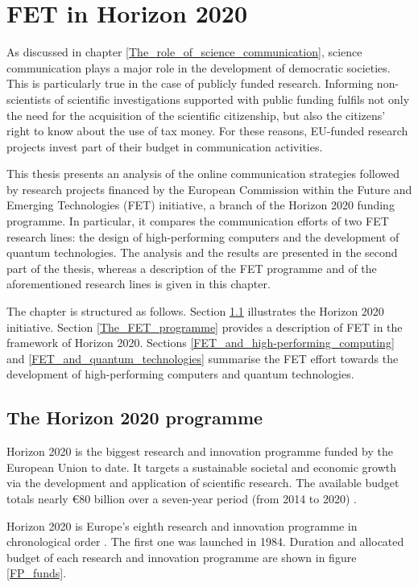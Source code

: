 \chapter{FET in Horizon 2020} \label{FET_in_Horizon_2020}
As discussed in chapter \ref{The_role_of_science_communication}, science communication plays a major role in the development of democratic societies. This is particularly true in the case of publicly funded research. Informing non-scientists of scientific investigations supported with public funding fulfils not only the need for the acquisition of the scientific citizenship, but also the citizens' right to know about the use of tax money. For these reasons, EU-funded research projects invest part of their budget in communication activities. 

This thesis presents an analysis of the online communication strategies followed by research projects financed by the European Commission within the Future and Emerging Technologies (FET) initiative, a branch of the Horizon 2020 funding programme. In particular, it compares the communication efforts of two FET research lines: the design of high-performing computers and the development of quantum technologies. The analysis and the results are presented in the second part of the thesis, whereas a description of the FET programme and of the aforementioned research lines is given in this chapter. 

The chapter is structured as follows. Section \ref{The_Horizon_2020_programme} illustrates the Horizon 2020 initiative. Section \ref{The_FET_programme} provides a description of FET in the framework of Horizon 2020. Sections \ref{FET_and_high-performing_computing} and \ref{FET_and_quantum_technologies} summarise the FET effort towards the development of high-performing computers and quantum technologies.

\section{The Horizon 2020 programme} \label{The_Horizon_2020_programme}
Horizon 2020 is the biggest research and innovation programme funded by the European Union to date. It targets a  sustainable societal and economic growth via the development and application of scientific research. The available budget totals nearly \euro 80 billion over a seven-year period (from 2014 to 2020) \cite{Horizon2020}.

Horizon 2020 is Europe's eighth research and innovation programme in chronological order \cite{FP4,FP5,FP6,FP7}. The first one was launched in 1984. Duration and allocated budget of each research and innovation programme are shown in figure \ref{FP_funds}.

